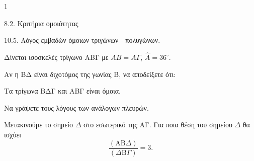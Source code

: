 \begin{ylh}{1}
    \item 8.2. Κριτήρια ομοιότητας
    \item 10.5. Λόγος εμβαδών όμοιων τριγώνων - πολυγώνων.
\end{ylh}
Δίνεται ισοσκελές τρίγωνο ΑΒΓ με $AB = A\Gamma$, $\hat{A} = 36^\circ$.

\begin{figure}
\end{figure}

\begin{alist}
\item Αν η ΒΔ είναι διχοτόμος της γωνίας Β, να αποδείξετε ότι:
\begin{rlist}
\item Τα τρίγωνα ΒΔΓ και ΑΒΓ είναι όμοια. 
\item Να γράψετε τους λόγους των ανάλογων πλευρών. 
\end{rlist}
\item Μετακινούμε το σημείο $\Delta$ στο εσωτερικό της ΑΓ. Για ποια θέση του σημείου $\Delta$ θα ισχύει
\[ \frac{(\text{AB}\Delta)}{(\Delta\text{B}\Gamma)} = 3. \] 
\end{alist}